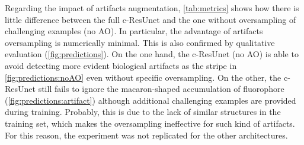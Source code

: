 Regarding the impact of artifacts augmentation, \cref{tab:metrics} shows how there is little difference between the full c-ResUnet and the one without oversampling of challenging examples (no AO).
In particular, the advantage of artifacts oversampling is numerically minimal.
This is also confirmed by qualitative evaluation (\cref{fig:predictions}).
On the one hand, the c-ResUnet (no AO) is able to avoid detecting more evident biological artifacts as the stripe  in \cref{fig:predictions:noAO} even without specific oversampling.
On the other, the c-ResUnet  still fails to ignore the macaron-shaped accumulation of fluorophore (\cref{fig:predictions:artifact}) although additional challenging examples are provided during training.
Probably, this is due to the lack of similar structures in the training set, which makes the oversampling ineffective for such kind of artifacts.
For this reason, the experiment was not replicated for the other architectures. 

